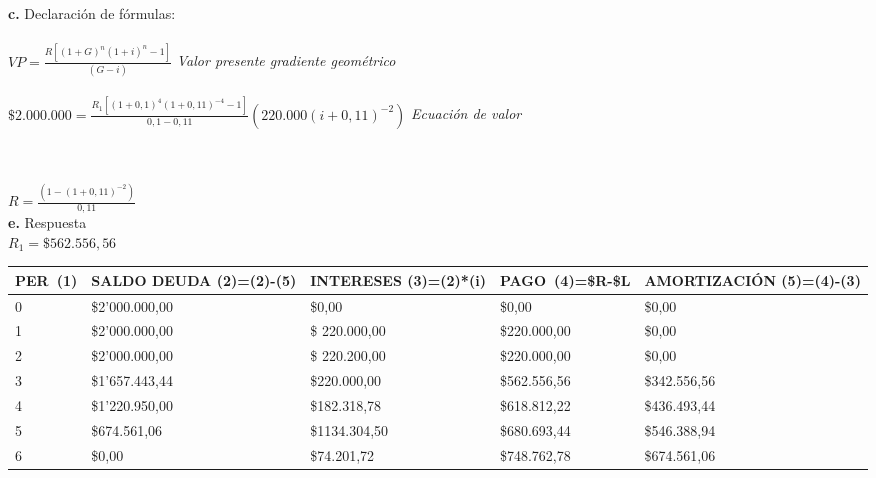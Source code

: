 \textbf{c.} Declaración de fórmulas:\\\\

	$VP=\frac{R[(1+G)^{n}(1+i)^{n}-1]}{(G-i)}$ \hspace{35 pt} \textit{Valor presente gradiente geométrico}\\
	
	\\
	$\$ 2.000.000=  \frac{R_{1} [(1+0,1)^{4} (1+0,11)^{-4}-1]}{0,1-0,11}(220.000(i+0,11)^{-2})$ \hspace{35 pt} \textit{Ecuación de valor}
	
	\\\\
	$R =  \frac{(1-(1+0,11)^{-2})}{0,11}$ \\

\textbf{e.} Respuesta\\
$	R_{1}=\$ 562.556,56$

\begin{spacing}{1.1}
    \begin{center}
        \begin{tabular}{|p{1cm}|p{2cm}|p{2cm}|p{2cm}|p{3cm}|}
        \hline 
        \rowcolor{white!50}
            \textbf{PER\ (1)} & \textbf{SALDO DEUDA (2)=(2)-(5)} & \textbf{INTERESES  (3)=(2)*(i)}& \textbf{PAGO\ (4)=\$R-\$L }& \textbf{AMORTIZACIÓN  (5)=(4)-(3)} \\ \hline                        

            0 & \$2'000.000,00 & \$0,00 & \$0,00 & \$0,00 \\ \hline 
            1 & \$2'000.000,00  &\$ 220.000,00  & \$220.000,00  & \$0,00 \\ \hline
            2 & \$2'000.000,00  &\$ 220.200,00  & \$220.000,00  & \$0,00 \\ \hline
            3 & \$1'657.443,44 & \$220.000,00  & \$562.556,56 & \$342.556,56 \\ \hline
            4 & \$1'220.950,00  & \$182.318,78  & \$618.812,22  & \$436.493,44\\ \hline
            5 & \$674.561,06  & \$1134.304,50  & \$680.693,44  & \$546.388,94 \\ \hline
            6 & \$0,00  & \$74.201,72  & \$748.762,78  & \$674.561,06 \\ \hline

 
\end{tabular}
\end{center}
\end{spacing}



